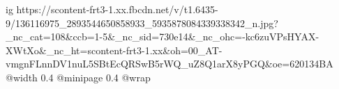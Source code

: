  
 
 
 
 

\ifcmt
  ig https://scontent-frt3-1.xx.fbcdn.net/v/t1.6435-9/136116975_2893544650858933_5935878084339338342_n.jpg?_nc_cat=108&ccb=1-5&_nc_sid=730e14&_nc_ohc=-kc6zuVPsHYAX-XWtXo&_nc_ht=scontent-frt3-1.xx&oh=00_AT-vmgnFLnnDV1nuL5SBtEcQRSwB5rWQ_uZ8Q1arX8yPGQ&oe=620134BA
  @width 0.4
  @minipage 0.4
  @wrap \parpic[r]
\fi

